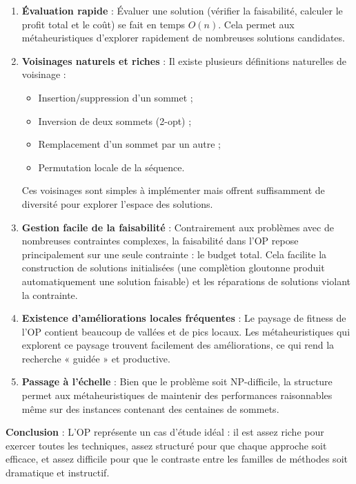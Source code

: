 \documentclass[11pt,a4paper]{article}
\begin{document}
\begin{enumerate}
    \item \textbf{Évaluation rapide} : Évaluer une solution (vérifier la faisabilité, calculer le profit total et le coût) se fait en temps $O(n)$. Cela permet aux métaheuristiques d'explorer rapidement de nombreuses solutions candidates.
    
    \item \textbf{Voisinages naturels et riches} : Il existe plusieurs définitions naturelles de voisinage :
    \begin{itemize}
        \item Insertion/suppression d'un sommet ;
        \item Inversion de deux sommets (2-opt) ;
        \item Remplacement d'un sommet par un autre ;
        \item Permutation locale de la séquence.
    \end{itemize}
    Ces voisinages sont simples à implémenter mais offrent suffisamment de diversité pour explorer l'espace des solutions.
    
    \item \textbf{Gestion facile de la faisabilité} : Contrairement aux problèmes avec de nombreuses contraintes complexes, la faisabilité dans l'OP repose principalement sur une seule contrainte : le budget total. Cela facilite la construction de solutions initialisées (une complètion gloutonne produit automatiquement une solution faisable) et les réparations de solutions violant la contrainte.
    
    \item \textbf{Existence d'améliorations locales fréquentes} : Le paysage de fitness de l'OP contient beaucoup de vallées et de pics locaux. Les métaheuristiques qui explorent ce paysage trouvent facilement des améliorations, ce qui rend la recherche « guidée » et productive.
    
    \item \textbf{Passage à l'échelle} : Bien que le problème soit NP-difficile, la structure permet aux métaheuristiques de maintenir des performances raisonnables même sur des instances contenant des centaines de sommets.
\end{enumerate}

\textbf{Conclusion} : L'OP représente un cas d'étude idéal : il est assez riche pour exercer toutes les techniques, assez structuré pour que chaque approche soit efficace, et assez difficile pour que le contraste entre les familles de méthodes soit dramatique et instructif.
\end{document}
